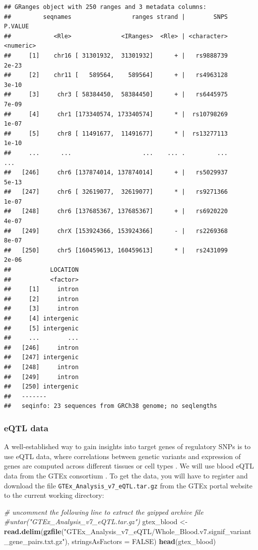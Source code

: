 \documentclass[9pt,a4paper,]{extarticle}
\newenvironment{Shaded}{\begin{snugshade}}{\end{snugshade}}
\newcommand{\KeywordTok}[1]{\textcolor[rgb]{0.13,0.29,0.53}{\textbf{#1}}}
\newcommand{\DataTypeTok}[1]{\textcolor[rgb]{0.13,0.29,0.53}{#1}}
\newcommand{\StringTok}[1]{\textcolor[rgb]{0.31,0.60,0.02}{#1}}
\newcommand{\CommentTok}[1]{\textcolor[rgb]{0.56,0.35,0.01}{\textit{#1}}}
\newcommand{\OtherTok}[1]{\textcolor[rgb]{0.56,0.35,0.01}{#1}}
\newcommand{\NormalTok}[1]{#1}
\begin{document}
\begin{verbatim}
## GRanges object with 250 ranges and 3 metadata columns:
##         seqnames                 ranges strand |        SNPS   P.VALUE
##            <Rle>              <IRanges>  <Rle> | <character> <numeric>
##     [1]    chr16 [ 31301932,  31301932]      + |   rs9888739     2e-23
##     [2]    chr11 [   589564,    589564]      + |   rs4963128     3e-10
##     [3]     chr3 [ 58384450,  58384450]      + |   rs6445975     7e-09
##     [4]     chr1 [173340574, 173340574]      * |  rs10798269     1e-07
##     [5]     chr8 [ 11491677,  11491677]      * |  rs13277113     1e-10
##     ...      ...                    ...    ... .         ...       ...
##   [246]     chr6 [137874014, 137874014]      + |   rs5029937     5e-13
##   [247]     chr6 [ 32619077,  32619077]      * |   rs9271366     1e-07
##   [248]     chr6 [137685367, 137685367]      + |   rs6920220     4e-07
##   [249]     chrX [153924366, 153924366]      - |   rs2269368     8e-07
##   [250]     chr5 [160459613, 160459613]      * |   rs2431099     2e-06
##           LOCATION
##           <factor>
##     [1]     intron
##     [2]     intron
##     [3]     intron
##     [4] intergenic
##     [5] intergenic
##     ...        ...
##   [246]     intron
##   [247] intergenic
##   [248]     intron
##   [249]     intron
##   [250] intergenic
##   -------
##   seqinfo: 23 sequences from GRCh38 genome; no seqlengths
\end{verbatim}

\subsubsection{eQTL data}\label{eqtl-data}

A well-established way to gain insights into target genes of regulatory SNPs is to use eQTL data, where correlations between genetic variants and expression of genes are computed across different tissues or cell types \citep{Albert2015}.
We will use blood eQTL data from the GTEx consortium \citep{GTEx2017a}.
To get the data, you will have to register and download the file \texttt{GTEx\_Analysis\_v7\_eQTL.tar.gz} from the GTEx portal website \citep{GTEx2017b} to the current working directory:

\begin{Shaded}
\begin{Highlighting}[]
\CommentTok{# uncomment the following line to extract the gzipped archive file}
\CommentTok{#untar("GTEx_Analysis_v7_eQTL.tar.gz")}
\NormalTok{gtex_blood <-}\StringTok{ }\KeywordTok{read.delim}\NormalTok{(}\KeywordTok{gzfile}\NormalTok{(}\StringTok{"GTEx_Analysis_v7_eQTL/Whole_Blood.v7.signif_variant_gene_pairs.txt.gz"}\NormalTok{), }\DataTypeTok{stringsAsFactors =} \OtherTok{FALSE}\NormalTok{)}
\KeywordTok{head}\NormalTok{(gtex_blood)}
\end{Highlighting}
\end{Shaded}
\end{document}
